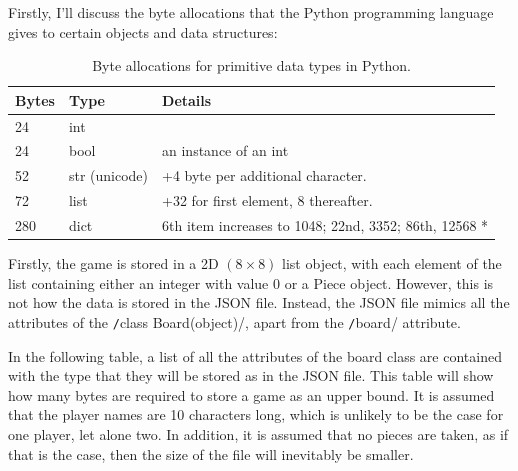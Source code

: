 Firstly, I'll discuss the byte allocations that the Python programming language gives to certain objects and data structures:
\begin{table}[H]
\centering
	\begin{tabular}{| l | l | l |}
		\hline
		\textbf{Bytes} & \textbf{Type} & \textbf{Details} \\ \hline
		24 & int & \\ \hline
		24 & bool & an instance of an int\\ \hline
		52 & str (unicode) & +4 byte per additional character. \\ \hline
		72 & list & +32 for first element, 8 thereafter. \\ \hline
		280 & dict & 6th item increases to 1048; 22nd, 3352; 86th, 12568 * \\ \hline
	\end{tabular}
	\caption{Byte allocations for primitive data types in Python.}
\end{table}
Firstly, the game is stored in a 2D $ (8\times8) $ list object, with each element of the list containing either an integer with value 0 or a Piece object. However, this is not how the data is stored in the JSON file. Instead, the JSON file mimics all the attributes of the \texttt/class Board(object)/, apart from the \texttt/board/ attribute.

In the following table, a list of all the attributes of the board class are contained with the type that they will be stored as in the JSON file. This table will show how many bytes are required to store a game as an upper bound. It is assumed that the player names are 10 characters long, which is unlikely to be the case for one player, let alone two. In addition, it is assumed that no pieces are taken, as if that is the case, then the size of the file will inevitably be smaller.

